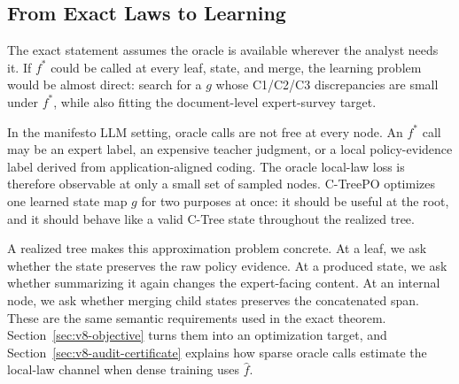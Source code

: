 \subsection{From Exact Laws to Learning}

The exact statement assumes the oracle is available wherever the
analyst needs it. If \(f^\ast\) could be called at every leaf, state,
and merge, the learning problem would be almost direct: search for a
\(g\) whose C1/C2/C3 discrepancies are small under \(f^\ast\), while
also fitting the document-level expert-survey target.

In the manifesto LLM setting, oracle calls are not free at every node.
An \(f^\ast\) call may be an expert label, an expensive teacher
judgment, or a local policy-evidence label derived from
application-aligned coding. The oracle local-law loss is therefore
observable at only a small set of sampled nodes. C-TreePO optimizes
one learned state map \(g\) for two purposes at once: it should be
useful at the root, and it should behave like a valid C-Tree state
throughout the realized tree.

A realized tree makes this approximation problem concrete. At a leaf,
we ask whether the state preserves the raw policy evidence. At a
produced state, we ask whether summarizing it again changes the
expert-facing content. At an internal node, we ask whether merging
child states preserves the concatenated span. These are the same
semantic requirements used in the exact theorem.
Section~\ref{sec:v8-objective} turns them into an optimization target,
and Section~\ref{sec:v8-audit-certificate} explains how sparse oracle
calls estimate the local-law channel when dense training uses
\(\widehat f\).
